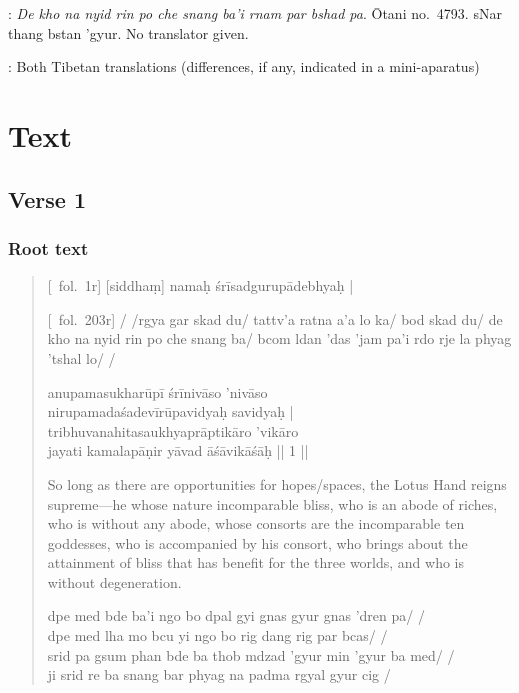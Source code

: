\documentclass[12pt]{article}
\newcommand{\emdash} {\hspace{0em}—\hspace{0em}}
\begin{document}
\noindent \TVB : \emph{De kho na nyid rin po che snang ba'i rnam par bshad pa}. Ōtani no.\ 4793. sNar thang bstan 'gyur. No translator given.

\noindent \TIB : Both Tibetan translations (differences, if any, indicated in a mini-aparatus)

\section{Text}
\subsection{Verse 1}
\subsubsection{Root text}
\begin{quote}
	[\MS\ fol.\ 1r] [siddhaṃ]\footnoteB{
		[siddhaṃ]] \MS ; oṁ \EDD
	} namaḥ śrīsadgurupādebhyaḥ |
	
	[\TM\ fol.\ 203r] / /rgya gar skad du/ tattv'a ratna a'a lo ka/ bod skad du/ de kho na nyid rin po che snang ba/ bcom ldan 'das 'jam pa'i rdo rje la phyag 'tshal lo/ /

	anupamasukharūpī śrīnivāso 'nivāso \\
	nirupamadaśadevīrūpavidyaḥ\footnoteB{
		nirupama°] \EDD\ ; nirūpama° \MS
	} savidyaḥ |\\
	tribhuvanahitasaukhyaprāptikāro 'vikāro \\
	jayati kamalapāṇir yāvad āśāvikāśāḥ\footnoteB{
		āśāvikāśāḥ] \corr ; āśāvikāsāḥ \MS\ \EDD
	} || 1 ||
	
	So long as there are opportunities for hopes/spaces, the Lotus Hand reigns supreme\emdash he whose nature incomparable bliss, who is an abode of riches, who is without any abode, whose consorts are the incomparable ten goddesses, who is accompanied by his consort, who brings about the attainment of bliss that has benefit for the three worlds, and who is without degeneration.
	
	dpe med bde ba'i ngo bo dpal gyi gnas gyur gnas 'dren pa/ /\\
	dpe med lha mo bcu yi ngo bo rig dang rig par bcas/ /\\
	srid pa gsum phan bde ba thob mdzad 'gyur min 'gyur ba med/ /\\
	ji srid re ba snang bar phyag na padma rgyal gyur cig /
\end{quote}
\end{document}
